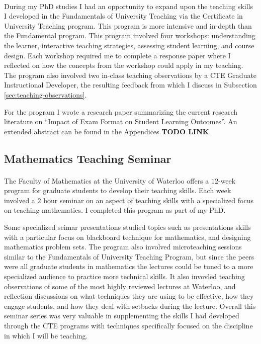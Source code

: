 \documentclass{article}
\begin{document}
\paragraph{}During my PhD studies I had an opportunity to expand upon the teaching skills I developed in the Fundamentals of University Teaching via the Certificate in University Teaching program. This program is more intensive and in-depth than the Fundamental program. This program involved four workshops: understanding the learner, interactive teaching strategies, assessing student learning, and course design. Each workshop required me to complete a response paper where I reflected on how the concepts from the workshop could apply in my teaching. The program also involved two in-class teaching observations by a CTE Graduate Instructional Developer, the resulting feedback from which I discuss in Subsection \ref{sec:teaching-observations}.

For the program I wrote a research paper summarizing the current research literature on ``Impact of Exam Format on Student Learning Outcomes''. An extended abstract can be found in the Appendices \textbf{TODO LINK}. 

\subsection{Mathematics Teaching Seminar} 
\paragraph{}
The Faculty of Mathematics at the University of Waterloo offers a $12$-week program for graduate students to develop their teaching skills. Each week involved a $2$ hour seminar on an aspect of teaching skills with a specialized focus on teaching mathematics. I completed this program as part of my PhD.

Some specialized seimar presentations studied topics such as presentations skills with a particular focus on blackboard technique for mathematics,  and designing mathematics problem sets. The program also involved microteaching sessions similar to the Fundamentals of University Teaching Program, but since the peers were all graduate students in mathematics the lectures could be tuned to a more specialized audience to practice more technical skills. It also invovled teaching observations of some of the most highly reviewed lectures at Waterloo, and reflection discussions on what techniques they are using to be effective, how they engage students, and how they deal with setbacks during the lecture. Overall this seminar series was very valuable in supplementing the skills I had developed through the CTE programs with techniques specifically focused on the discipline in which I will be teaching.
\end{document}
